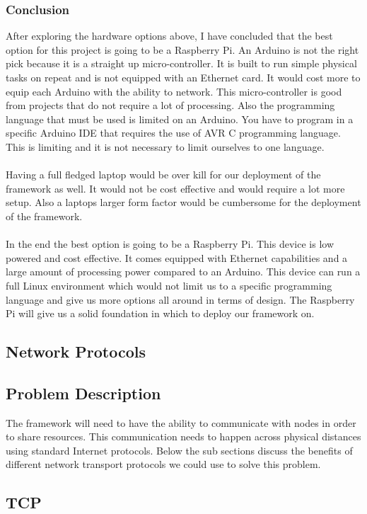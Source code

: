 \subsubsection{Conclusion}
After exploring the hardware options above, I have concluded that the best option for this project is going to be a Raspberry Pi. An Arduino is not the right pick because it is a straight up micro-controller. It is built to run simple physical tasks on repeat and is not equipped with an Ethernet card. It would cost more to equip each Arduino with the ability to network. This micro-controller is good from projects that do not require a lot of processing. Also the programming language that must be used is limited on an Arduino. You have to program in a specific Arduino IDE that requires the use of AVR C programming language. This is limiting and it is not necessary to limit ourselves to one language.
\\ \\
Having a full fledged laptop would be over kill for our deployment of the framework as well. It would not be cost effective and would require a lot more setup. Also a laptops larger form factor would be cumbersome for the deployment of the framework.
\\ \\
In the end the best option is going to be a Raspberry Pi. This device is low powered and cost effective. It comes equipped with Ethernet capabilities and a large amount of processing power compared to an Arduino. This device can run a full Linux environment which would not limit us to a specific programming language and give us more options all around in terms of design. The Raspberry Pi will give us a solid foundation in which to deploy our framework on.


\subsection{Network Protocols}
\subsection{Problem Description}
The framework will need to have the ability to communicate with nodes in order to share resources. This communication needs to happen across physical distances using standard Internet protocols. Below the sub sections discuss the benefits of different network transport protocols we could use to solve this problem.
\subsection{TCP}
